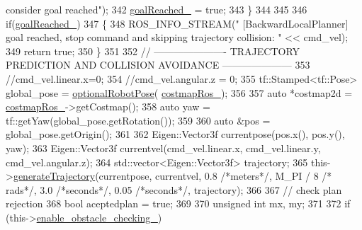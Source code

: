 \begin{DoxyCode}
{{       consider goal reached"});
342                 \hyperlink{classcl__move__base__z_1_1backward__local__planner_1_1BackwardLocalPlanner_ad443c52ef585a8eab0364f0909222f51}{goalReached\_} = \textcolor{keyword}{true};
343             \}
344 
345 
346             \textcolor{keywordflow}{if}(\hyperlink{classcl__move__base__z_1_1backward__local__planner_1_1BackwardLocalPlanner_ad443c52ef585a8eab0364f0909222f51}{goalReached\_})
347             \{
348                 ROS\_INFO\_STREAM(\textcolor{stringliteral}{" [BackwardLocalPlanner] goal reached, stop command and skipping trajectory
       collision: "} << cmd\_vel);
349                 \textcolor{keywordflow}{return} \textcolor{keyword}{true};
350             \}
351 
352             \textcolor{comment}{// ---------------------- TRAJECTORY PREDICTION AND COLLISION AVOIDANCE ---------------------}
353             \textcolor{comment}{//cmd\_vel.linear.x=0;}
354             \textcolor{comment}{//cmd\_vel.angular.z = 0;}
355             tf::Stamped<tf::Pose> global\_pose = \hyperlink{namespacecl__move__base__z_1_1backward__local__planner_afd5bb2a0d144f7b89f4215fbcb1fbe69}{optionalRobotPose}(
      \hyperlink{classcl__move__base__z_1_1backward__local__planner_1_1BackwardLocalPlanner_a4136268882a105d9e06e173d85d5c0dc}{costmapRos\_});
356 
357             \textcolor{keyword}{auto} *costmap2d = \hyperlink{classcl__move__base__z_1_1backward__local__planner_1_1BackwardLocalPlanner_a4136268882a105d9e06e173d85d5c0dc}{costmapRos\_}->getCostmap();
358             \textcolor{keyword}{auto} yaw = tf::getYaw(global\_pose.getRotation());
359 
360             \textcolor{keyword}{auto} &pos = global\_pose.getOrigin();
361 
362             Eigen::Vector3f currentpose(pos.x(), pos.y(), yaw);
363             Eigen::Vector3f currentvel(cmd\_vel.linear.x, cmd\_vel.linear.y, cmd\_vel.angular.z);
364             std::vector<Eigen::Vector3f> trajectory;
365             this->\hyperlink{classcl__move__base__z_1_1backward__local__planner_1_1BackwardLocalPlanner_a9e8921ca8ce379ca8ba321f82ca23cdc}{generateTrajectory}(currentpose, currentvel, 0.8 \textcolor{comment}{/*meters*/}, M\_PI / 8 \textcolor{comment}{/*
      rads*/}, 3.0 \textcolor{comment}{/*seconds*/}, 0.05 \textcolor{comment}{/*seconds*/}, trajectory);
366 
367             \textcolor{comment}{// check plan rejection}
368             \textcolor{keywordtype}{bool} aceptedplan = \textcolor{keyword}{true};
369 
370             \textcolor{keywordtype}{unsigned} \textcolor{keywordtype}{int} mx, my;
371 
372             \textcolor{keywordflow}{if} (this->\hyperlink{classcl__move__base__z_1_1backward__local__planner_1_1BackwardLocalPlanner_a154043366660cc02ec758dda32817511}{enable\_obstacle\_checking\_})
}
\end{DoxyCode}
